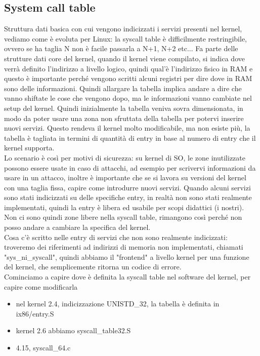 \documentclass[12pt, oneside]{extbook}
\begin{document}
\subsection{System call table}
Struttura dati basica con cui vengono indicizzati i servizi presenti nel kernel, vediamo come è evoluta per Linux: la syscall table è difficilmente restringibile, ovvero se ha taglia N non è facile passarla a N+1, N+2 etc... Fa parte delle strutture dati core del kernel, quando il kernel viene compilato, si indica dove verrà definito l'indirizzo a livello logico, quindi qual'è l'indirizzo fisico in RAM e questo è importante perché vengono scritti alcuni registri per dire dove in RAM sono delle informazioni. Quindi allargare la tabella implica andare a dire che vanno shiftate le cose che vengono dopo, ma le informazioni vanno cambiate nel setup del kernel. Quindi inizialmente la tabella veniva sovra dimensionata, in modo da poter usare una zona non sfruttata della tabella per potervi inserire nuovi servizi. Questo rendeva il kernel molto modificabile, ma non esiste più, la tabella è tagliata in termini di quantità di entry in base al numero di entry che il kernel supporta.\\ Lo scenario è così per motivi di sicurezza: su kernel di SO, le zone inutilizzate possono essere usate in caso di attacchi, ad esempio per scrivervi informazioni da usare in un attacco, inoltre è importante che se si lavora su versioni del kernel con una taglia fissa, capire come introdurre nuovi servizi. Quando alcuni servizi sono stati indicizzati su delle specifiche entry, in realtà non sono stati realmente implementati, quindi la entry è libera ed usabile per scopi didattici (i nostri).\\ Non ci sono quindi zone libere nella syscall table, rimangono così perché non posso andare a cambiare la specifica del kernel.\\ Cosa c'è scritto nelle entry di servizi che non sono realmente indicizzati: troveremo dei riferimenti ad indirizzi di memoria non implementati, chiamati \textsf{"sys\_ni\_syscall"}, quindi abbiamo il "frontend" a livello kernel per una funzione del kernel, che semplicemente ritorna un codice di errore.\\ Cominciamo a capire dove è definita la syscall table nel software del kernel, per capire come modificarla
\begin{itemize}
\item nel kernel 2.4, indicizzazione UNISTD\_32, la tabella è definita in ix86/entry.S
\item kernel 2.6 abbiamo syscall\_table32.S
\item 4.15, syscall\_64.c
\end{itemize}
\end{document}
